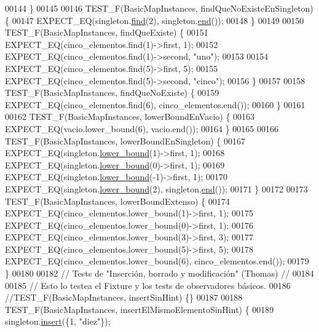 \begin{DoxyCode}
00144 \}
00145 
00146 TEST\_F(BasicMapInstances, findQueNoExisteEnSingleton) \{
00147     EXPECT\_EQ(singleton.\hyperlink{classaed2_1_1map_afd0fc1a8234888e61e0e615de7e245b8_afd0fc1a8234888e61e0e615de7e245b8}{find}(2), singleton.\hyperlink{classaed2_1_1map_a76023e6a56cb625513e1b5ea028bf983_a76023e6a56cb625513e1b5ea028bf983}{end}());
00148 \}
00149 
00150 TEST\_F(BasicMapInstances, findQueExiste) \{
00151     EXPECT\_EQ(cinco\_elementos.find(1)->first, 1);
00152     EXPECT\_EQ(cinco\_elementos.find(1)->second, \textcolor{stringliteral}{"uno"});
00153 
00154     EXPECT\_EQ(cinco\_elementos.find(5)->first, 5);
00155     EXPECT\_EQ(cinco\_elementos.find(5)->second, \textcolor{stringliteral}{"cinco"});
00156 \}
00157 
00158 TEST\_F(BasicMapInstances, findQueNoExiste) \{
00159     EXPECT\_EQ(cinco\_elementos.find(6), cinco\_elementos.end());
00160 \}
00161 
00162 TEST\_F(BasicMapInstances, lowerBoundEnVacio) \{
00163     EXPECT\_EQ(vacio.lower\_bound(6), vacio.end());
00164 \}
00165 
00166 TEST\_F(BasicMapInstances, lowerBoundEnSingleton) \{
00167     EXPECT\_EQ(singleton.\hyperlink{classaed2_1_1map_a62075a47afdf89267c5462f88164af3d_a62075a47afdf89267c5462f88164af3d}{lower\_bound}(1)->first, 1);
00168     EXPECT\_EQ(singleton.\hyperlink{classaed2_1_1map_a62075a47afdf89267c5462f88164af3d_a62075a47afdf89267c5462f88164af3d}{lower\_bound}(0)->first, 1);
00169     EXPECT\_EQ(singleton.\hyperlink{classaed2_1_1map_a62075a47afdf89267c5462f88164af3d_a62075a47afdf89267c5462f88164af3d}{lower\_bound}(-1)->first, 1);
00170     EXPECT\_EQ(singleton.\hyperlink{classaed2_1_1map_a62075a47afdf89267c5462f88164af3d_a62075a47afdf89267c5462f88164af3d}{lower\_bound}(2), singleton.\hyperlink{classaed2_1_1map_a76023e6a56cb625513e1b5ea028bf983_a76023e6a56cb625513e1b5ea028bf983}{end}());
00171 \}
00172 
00173 TEST\_F(BasicMapInstances, lowerBoundExtenso) \{
00174     EXPECT\_EQ(cinco\_elementos.lower\_bound(1)->first, 1);
00175     EXPECT\_EQ(cinco\_elementos.lower\_bound(0)->first, 1);
00176     EXPECT\_EQ(cinco\_elementos.lower\_bound(3)->first, 3);
00177     EXPECT\_EQ(cinco\_elementos.lower\_bound(5)->first, 5);
00178     EXPECT\_EQ(cinco\_elementos.lower\_bound(6), cinco\_elementos.end());
00179 \}
00180 
00182 \textcolor{comment}{// Tests de "Inserción, borrado y modificación" (Thomas) //}
00184 \textcolor{comment}{}
00185 \textcolor{comment}{// Esto lo testea el Fixture y los tests de observadores básicos.}
00186 \textcolor{comment}{//TEST\_F(BasicMapInstances, insertSinHint) \{\}}
00187 
00188 TEST\_F(BasicMapInstances, insertElMismoElementoSinHint) \{
00189     singleton.\hyperlink{classaed2_1_1map_a60aacba06b1579630b3c8e996cf248c8_a60aacba06b1579630b3c8e996cf248c8}{insert}(\{1, \textcolor{stringliteral}{"diez"}\});

\end{DoxyCode}
